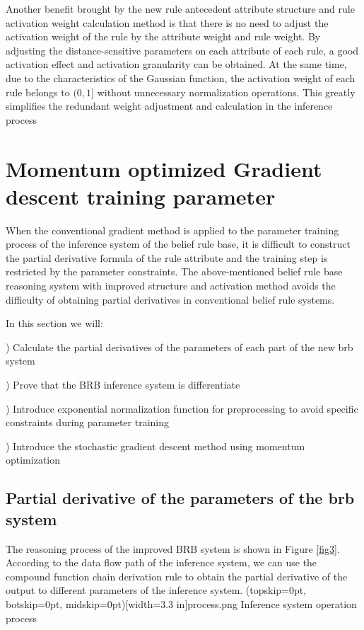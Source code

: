 \documentclass{ieeeaccess}
\begin{document}
Another benefit brought by the new rule antecedent attribute structure and rule activation weight calculation method is that
there is no need to adjust the activation weight of the rule by the attribute weight and rule weight.
By adjusting the distance-sensitive parameters on each attribute of each rule, a good activation effect and activation granularity can be obtained.
At the same time, due to the characteristics of the Gaussian function, the activation weight of each rule belongs to $(0, 1]$ without unnecessary normalization operations.
This greatly simplifies the redundant weight adjustment and calculation in the inference process


\section{Momentum optimized Gradient descent training parameter}
When the conventional gradient method is applied to the parameter training process of the inference system of the belief rule base,
it is difficult to construct the partial derivative formula of the rule attribute and the training step is restricted by the parameter constraints.
The above-mentioned belief rule base reasoning system with improved structure and activation method avoids the difficulty of obtaining partial derivatives in conventional belief rule systems.

In this section we will:

) Calculate the partial derivatives of the parameters of each part of the new brb system

) Prove that the BRB inference system is differentiate

) Introduce exponential normalization function for preprocessing to avoid specific constraints during parameter training

) Introduce the stochastic gradient descent method using momentum optimization


\subsection{Partial derivative of the parameters of the brb system}
The reasoning process of the improved BRB system is shown in Figure \ref{fig3}.
According to the data flow path of the inference system, we can use the compound function chain derivation rule to obtain the partial derivative of the output to different parameters of the inference system.
\Figure[!t](topskip=0pt, botskip=0pt, midskip=0pt)[width=3.3 in]{process.png}
{Inference system operation process\label{fig3}}
\end{document}
